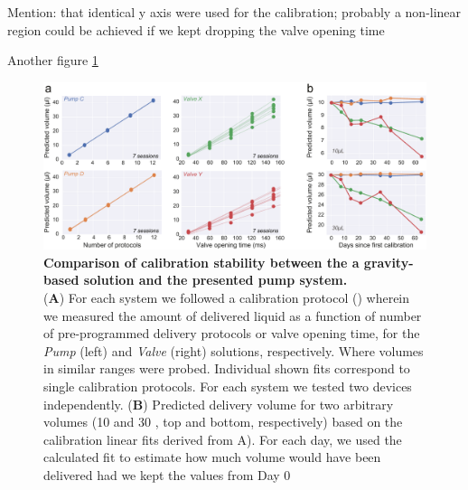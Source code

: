 Mention:
 that identical y axis were used for the calibration;
 probably a non-linear region could be achieved if we kept dropping the valve opening time
 
Another figure \ref{fig:PumpVsValve}
\begin{figure} 
	\centering
	\includegraphics[width=1.0\linewidth]{Figures/Artboard 2.pdf}
	\caption{\textbf{Comparison of calibration stability between the a gravity-based solution and the presented pump system.}\\
		(\textbf{A}) For each system we followed a calibration protocol () wherein we measured the amount of delivered liquid as a function of number of pre-programmed delivery protocols or valve opening time, for the \textit{Pump} (left) and \textit{Valve} (right) solutions, respectively. Where volumes in similar ranges were probed. Individual shown fits correspond to single calibration protocols. For each system we tested two devices independently.  (\textbf{B}) Predicted delivery volume for two arbitrary volumes (10 and 30 , top and bottom, respectively) based on the calibration linear fits derived from A). For each day, we used the calculated fit to estimate how much volume would have been delivered had we kept the values from Day 0}
	\label{fig:PumpVsValve} 
\end{figure}


